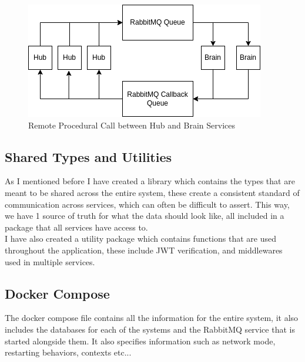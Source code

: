 \documentclass[titlepage]{article}
\begin{document}
\begin{figure}
\caption{Remote Procedural Call between Hub and Brain Services}
\centering
\includegraphics[width=\textwidth]{RPC.png}
\end{figure}
\pagebreak

\subsection{Shared Types and Utilities}
As I mentioned before I have created a library which contains the types that are meant to be shared across the entire system, these create a consistent standard of communication across services, which can often be difficult to assert. This way, we have 1 source of truth for what the data should look like, all included in a package that all services have access to. \\

I have also created a utility package which contains functions that are used throughout the application, these include JWT verification, and middlewares used in multiple services. 

\pagebreak

\subsection{Docker Compose}
The docker compose file contains all the information for the entire system, it also includes the databases for each of the systems and the RabbitMQ service that is started alongside them. It also specifies information such as network mode, restarting behaviors, contexts etc...
\end{document}
